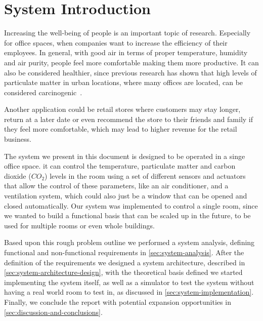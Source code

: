 \section{System Introduction}\label{sec:system-introduction}

Increasing the well-being of people is an important topic of research.
Especially for office spaces, when companies want to increase the efficiency of their employees.
In general, with good air in terms of proper temperature, humidity and air purity, people feel more comfortable making them more productive.
It can also be considered healthier, since previous research has shown that high levels of particulate matter in urban locations, where many offices are located, can be considered carcinogenic~\cite{pehnec2020carcinogenic}.

Another application could be retail stores where customers may stay longer, return at a later date or even recommend the store to their friends and family if they feel more comfortable, which may lead to higher revenue for the retail business.

The system we present in this document is designed to be operated in a singe office space.
it can control the temperature, particulate matter and carbon dioxide ($CO_2$) levels in the room using a set of different sensors and actuators that allow the control of these parameters, like an air conditioner, and a ventilation system, which could also just be a window that can be opened and closed automatically.
Our system was implemented to control a single room, since we wanted to build a functional basis that can be scaled up in the future, to be used for multiple rooms or even whole buildings.

Based upon this rough problem outline we performed a system analysis, defining functional and non-functional requirements in \cref{sec:system-analysis}.
After the definition of the requirements we designed a system architecture, described in \cref{sec:system-architecture-design}, with the theoretical basis defined we started implementing the system itself, as well as a simulator to test the system without having a real world room to test in, as discussed in \cref{sec:system-implementation}.
Finally, we conclude the report with potential expansion opportunities in \cref{sec:discussion-and-conclusions}.

